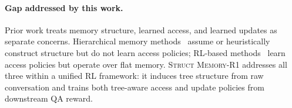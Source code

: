 \paragraph{Gap addressed by this work.}
Prior work treats memory structure, learned access, and learned updates as separate concerns. Hierarchical memory methods~ assume or heuristically construct structure but do not learn access policies; RL-based methods~ learn access policies but operate over flat memory. \textsc{Struct Memory-R1} addresses all three within a unified RL framework: it induces tree structure from raw conversation and trains both tree-aware access and update policies from downstream QA reward.
